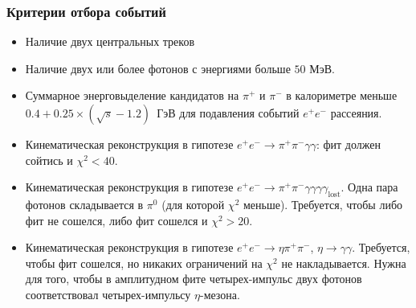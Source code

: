 \documentclass{beamer}
\begin{document}
\begin{frame}
  \frametitle{Критерии отбора событий}
  \scriptsize
  \begin{itemize}
    \item Наличие двух центральных треков
    \item Наличие двух или более фотонов с энергиями больше $50\text{ МэВ}$.
    \item Суммарное энерговыделение кандидатов на $\pi^+$ и $\pi^-$ в калориметре меньше
      $0.4 + 0.25\times(\sqrt{s} - 1.2)$~ГэВ для подавления событий $e^+e^-$ рассеяния.
    \item Кинематическая реконструкция
      в гипотезе $e^+e^-\rightarrow\pi^+\pi^-\gamma\gamma$: фит должен сойтись
      и $\chi^2<40$.
    \item Кинематическая реконструкция в гипотезе $e^+e^-\rightarrow\pi^+\pi^-\gamma\gamma\gamma\gamma_{\text{lost}}$. Одна
      пара фотонов складывается в $\pi^0$ (для которой $\chi^2$ меньше). Требуется, чтобы
      либо фит не сошелся, либо фит сошелся и $\chi^2>20$.
    \item Кинематическая реконструкция в гипотезе $e^+e^-\rightarrow\eta\pi^+\pi^-$, $\eta\rightarrow\gamma\gamma$. Требуется,
      чтобы фит сошелся, но никаких ограничений на $\chi^2$ не накладывается. Нужна
      для того, чтобы в амплитудном фите четырех-импульс двух фотонов
      соответствовал четырех-импульсу $\eta$-мезона.
    \end{itemize}
  \end{frame}
\end{document}
